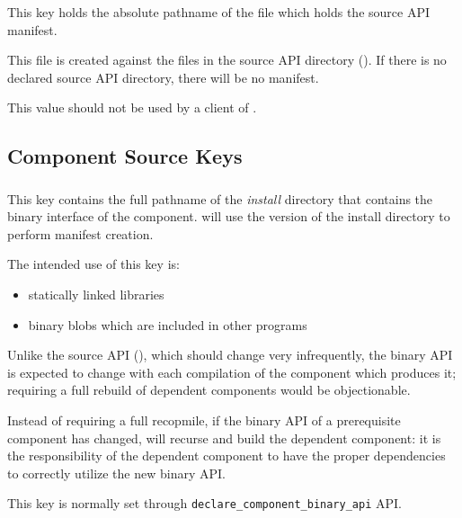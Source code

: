 This key holds the absolute pathname of the file which holds the
source API \mtree manifest.

This file is created against the files in the source API directory
().  If there is no declared source API
directory, there will be no manifest.

This value should not be used by a client of \lmsbw.

\subsection{Component Source Keys}

\subsubsection{}\label{lmsbwcomponent:binary-api}

This key contains the full pathname of the \emph{install} directory
that contains the binary interface of the component.  \lmsbw will use
the \destdir version of the install directory to perform \mtree
manifest creation.

The intended use of this key is:

\begin{itemize}
\item statically linked libraries
\item binary blobs which are included in other programs
\end{itemize}

Unlike the source API (), which should
change very infrequently, the binary API is expected to change with
each compilation of the component which produces it; requiring a full
rebuild of dependent components would be objectionable.

Instead of requiring a full recopmile, if the binary API of a
prerequisite component has changed, \lmsbw will recurse and build the
dependent component: it is the responsibility of the dependent
component to have the proper dependencies to correctly utilize the new
binary API.

This key is normally set through
\texttt{declare\_component\_binary\_api} API.

\subsubsection{}


